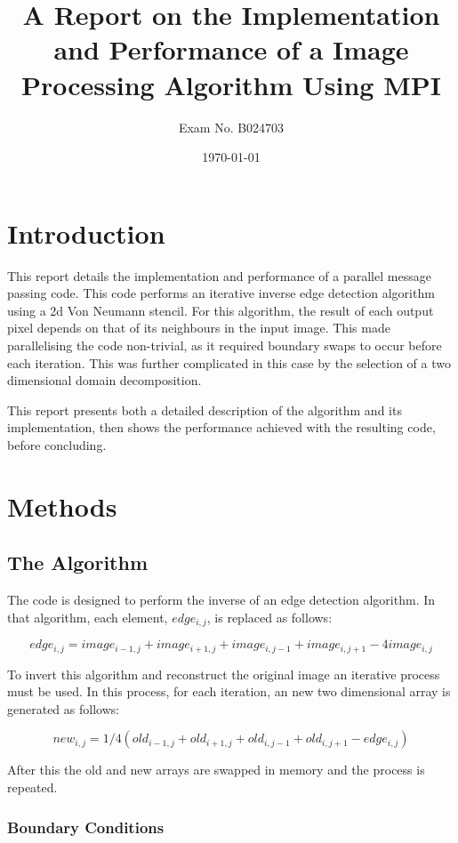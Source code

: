 \documentclass[a4paper,12pt]{article}
\begin{document}
\title{A Report on the Implementation and Performance of a Image Processing Algorithm Using MPI}
\author{Exam No. B024703}
\date{\today}
\maketitle

\section{Introduction}
This report details the implementation and performance of a parallel message passing code. This code performs an iterative inverse edge detection algorithm using a 2d Von Neumann stencil. For this algorithm, the result of each output pixel depends on that of its neighbours in the input image. This made parallelising the code non-trivial, as it required boundary swaps to occur before each iteration. This was further complicated in this case by the selection of a two dimensional domain decomposition.

This report presents both a detailed description of the algorithm and its implementation, then shows the performance achieved with the resulting code, before concluding.


\section{Methods}

\subsection{The Algorithm}

The code is designed to perform the inverse of an edge detection algorithm. In that algorithm, each element, $edge_{i,j}$, is replaced as follows:

$$edge_{i,j} = image_{i-1,j} + image_{i+1,j} + image_{i,j-1} + image_{i,j+1} {-} 4 image_{i,j}$$

To invert this algorithm and reconstruct the original image an iterative process must be used. In this process, for each iteration, an new two dimensional array is generated as follows:

$$new_{i,j} = 1/4 (old_{i-1,j} + old_{i+1,j} + old_{i,j-1} + old_{i,j+1} {-} edge_{i,j}) $$

After this the old and new arrays are swapped in memory and the process is repeated.

\subsubsection{Boundary Conditions}
\label{boundary_conditions}
\end{document}
